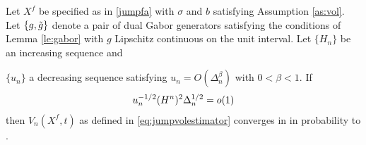 \begin{lem}\label{lem:finite}
  Let $X^f$ be specified as in \eqref{jumpfa} with $\sigma$ and $b$ satisfying Assumption \ref{as:vol}. Let $\{g, \tilde{g}\}$ denote a pair of dual Gabor generators satisfying the conditions of Lemma \eqref{le:gabor} with  $g$ Lipschitz continuous on the unit interval. Let  $\{H_n\}$ be an increasing sequence and   
  \begin{comment}
  \begin{enumerate}[label=\emph{(}\roman*\emph{)}]
    \item 
  the drift of $X$ satisfies with probability 1:
  \begin{align}
    \limsup_{\Delta_n \to 0} \frac{M^*}{(\Delta_n \log(1/\Delta_n))^{1/2}} \le  C< \infty, \notag
    \label{}
  \end{align}
where $M^* : = \sup_{1 \le i <n} \vert \int^{t_{i+1}}_{t_i} b(s) \D s\vert$;
\item the diffusion coefficient satisfies with probability 1:  $\int^1_0 \sigma^2(s) \D s < \infty$ and 
  \begin{align}
\limsup_{\Delta_n \to 0} \frac{S^*}{\Delta_n} \le B <\infty, \notag
    \label{}
  \end{align}
  where $S^* := \sup_{1 \le i <n} \vert \int^{t_{i+1}}_{t_i} \sigma^2(s) \D s\vert$;
  \end{enumerate}
  \end{comment}
  $\{u_n\}$  a decreasing sequence satisfying   $u_n = O(\Delta_n^\beta)$  with $0 <\beta <1$. If   
\begin{align}
  u_n^{-1/2} (H^n)^2 \Delta_n^{1/2} = o(1)\notag
    \label{}
  \end{align}
  then
  $V_n(X^f, t)$ as defined in \eqref{eq:jumpvolestimator}  converges in \Ltwo in probability to \sv.
\end{lem}
